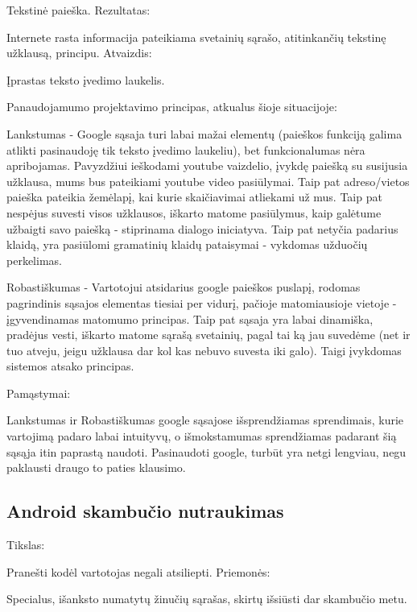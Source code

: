 ﻿\documentclass[a4paper, 12pt]{article}
\begin{document}
		Tekstinė paieška.\newline
		Rezultatas:

		Internete rasta informacija pateikiama svetainių sąrašo, atitinkančių tekstinę užklausą, principu.\newline
		Atvaizdis:

		Įprastas teksto įvedimo laukelis.\newline

		Panaudojamumo projektavimo principas, atkualus šioje situacijoje:

		Lankstumas - Google sąsaja turi labai mažai elementų (paieškos funkciją
		galima atlikti pasinaudoję tik teksto įvedimo laukeliu), bet funkcionalumas
		nėra apribojamas. Pavyzdžiui ieškodami youtube vaizdelio, įvykdę paiešką
		su susijusia užklausa, mums bus pateikiami youtube video pasiūlymai.
		Taip pat adreso/vietos paieška pateikia žemėlapį, kai kurie skaičiavimai
		atliekami už mus. Taip pat nespėjus suvesti visos užklausos, iškarto matome
		pasiūlymus, kaip galėtume užbaigti savo paiešką - stiprinama dialogo iniciatyva.
		Taip pat netyčia padarius klaidą, yra pasiūlomi gramatinių klaidų pataisymai -
		vykdomas užduočių perkelimas.

		Robastiškumas - Vartotojui atsidarius google paieškos puslapį, rodomas
		pagrindinis sąsajos elementas tiesiai per vidurį, pačioje matomiausioje
		vietoje - įgyvendinamas matomumo principas. Taip pat sąsaja yra labai dinamiška,
		pradėjus vesti, iškarto matome sąrašą svetainių, pagal tai ką jau suvedėme (net
		ir tuo atveju, jeigu užklausa dar kol kas nebuvo suvesta iki galo). Taigi 
		įvykdomas sistemos atsako principas.

		Pamąstymai:

		Lankstumas ir Robastiškumas google sąsajose išsprendžiamas sprendimais,
		kurie vartojimą padaro labai intuityvų, o išmokstamumas	sprendžiamas padarant
		šią sąsąja itin paprastą naudoti. Pasinaudoti google, turbūt yra netgi lengviau,
		negu paklausti draugo to paties klausimo.
	\subsection{Android skambučio nutraukimas}
		Tikslas:

		Pranešti kodėl vartotojas negali atsiliepti.\newline
		Priemonės:

		Specialus, išanksto numatytų žinučių sąrašas, skirtų išsiūsti dar skambučio metu.\newline
\end{document}
